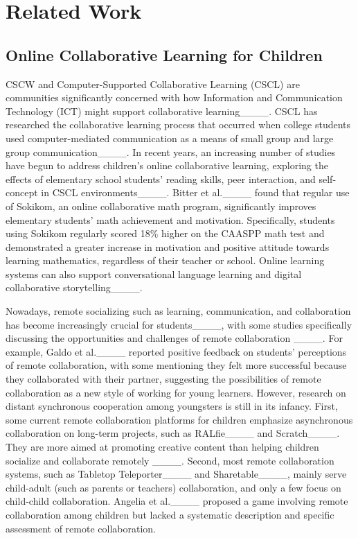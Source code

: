 \section{Related Work}
\subsection{Online Collaborative Learning for Children}

CSCW and Computer-Supported Collaborative Learning (CSCL) are communities significantly concerned with how Information and Communication Technology (ICT) might support collaborative learning____. CSCL has researched the collaborative learning process that occurred when college students used computer-mediated communication as a means of small group and large group communication____. In recent years, an increasing number of studies have begun to address children's online collaborative learning, exploring the effects of elementary school students' reading skills, peer interaction, and self-concept in CSCL environments____. Bitter et al.____ found that regular use of Sokikom, an online collaborative math program, significantly improves elementary students' math achievement and motivation. Specifically, students using Sokikom regularly scored 18\% higher on the CAASPP math test and demonstrated a greater increase in motivation and positive attitude towards learning mathematics, regardless of their teacher or school. Online learning systems can also support conversational language learning and digital collaborative storytelling____.

Nowadays, remote socializing such as learning, communication, and collaboration has become increasingly crucial for students____, with some studies specifically discussing the opportunities and challenges of remote collaboration ____. For example, Galdo et al.____ reported positive feedback on students' perceptions of remote collaboration, with some mentioning they felt more successful because they collaborated with their partner, suggesting the possibilities of remote collaboration as a new style of working for young learners. However, research on distant synchronous cooperation among youngsters is still in its infancy. First, some current remote collaboration platforms for children emphasize asynchronous collaboration on long-term projects, such as RALfie____ and Scratch____. They are more aimed at promoting creative content than helping children socialize and collaborate remotely ____. Second, most remote collaboration systems, such as Tabletop Teleporter____ and Sharetable____, mainly serve child-adult (such as parents or teachers) collaboration, and only a few focus on child-child collaboration. Angelia et al.____ proposed a game involving remote collaboration among children but lacked a systematic description and specific assessment of remote collaboration. 

